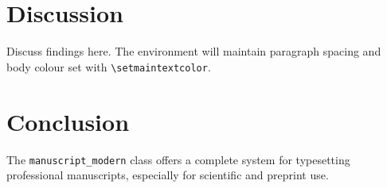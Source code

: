 \documentclass{manuscript_modern}
\begin{document}
\begin{maintext}
	
	\section{Discussion}

		Discuss findings here. The environment will maintain paragraph spacing and body colour set with \verb|\setmaintextcolor|.

	
	\section{Conclusion}

		The \texttt{manuscript\_modern} class offers a complete system for typesetting professional manuscripts, especially for scientific and preprint use.
	\end{maintext}
	

	
	\greyhrule
	\begin{manuscriptinfo}
	\end{manuscriptinfo}
	
	\greyhrule
	\printbibliography
	
\end{document}
